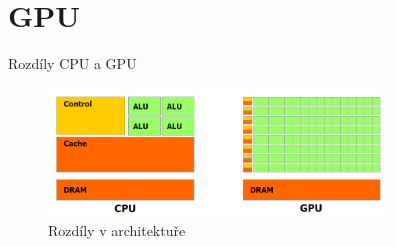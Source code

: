 \documentclass[compress,mathserif]{beamer}
\theoremstyle{definition}
\theoremstyle{plain}
\begin{document}
\section{GPU}

     \begin{frame}{Rozdíly CPU a GPU}
        \begin{figure}
            \includegraphics[width=90mm]{img/CPUGPU.PNG}
            \caption{Rozdíly v architektuře}
        \end{figure}
    \end{frame}
\end{document}
